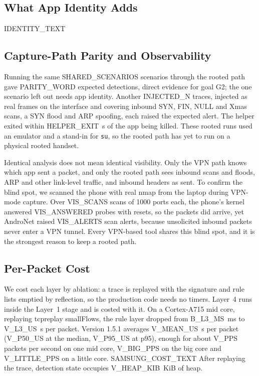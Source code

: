 \documentclass[runningheads]{llncs}
\begin{document}
\subsection{What App Identity Adds}\label{sec:identity}

{{IDENTITY_TEXT}}

\subsection{Capture-Path Parity and Observability}\label{sec:parity}

Running the same {{SHARED_SCENARIOS}} scenarios through the rooted path gave {{PARITY_WORD}} expected detections, direct evidence for goal G2; the one scenario left out needs app identity. Another {{INJECTED_N}} traces, injected as real frames on the interface and covering inbound SYN, FIN, NULL and Xmas scans, a SYN flood and ARP spoofing, each raised the expected alert. The helper exited within {{HELPER_EXIT}}~s of the app being killed. These rooted runs used an emulator and a stand-in for \texttt{su}, so the rooted path has yet to run on a physical rooted handset.

Identical analysis does not mean identical visibility. Only the VPN path knows which app sent a packet, and only the rooted path sees inbound scans and floods, ARP and other link-level traffic, and inbound headers as sent. To confirm the blind spot, we scanned the phone with real nmap from the laptop during VPN-mode capture. Over {{VIS_SCANS}} scans of 1000 ports each, the phone's kernel answered {{VIS_ANSWERED}} probes with resets, so the packets did arrive, yet AndroNet raised {{VIS_ALERTS}} scan alerts, because unsolicited inbound packets never enter a VPN tunnel. Every VPN-based tool shares this blind spot, and it is the strongest reason to keep a rooted path.

\subsection{Per-Packet Cost}\label{sec:cost}

We cost each layer by ablation: a trace is replayed with the signature and rule lists emptied by reflection, so the production code needs no timers. Layer~4 runs inside the Layer~1 stage and is costed with it. On a Cortex-A715 mid core, replaying tcpreplay smallFlows, the rule layer dropped from {{B_L3_MS}}~ms to {{V_L3_US}}~\textmu s per packet. Version 1.5.1 averages {{V_MEAN_US}}~\textmu s per packet ({{V_P50_US}} at the median, {{V_P95_US}} at p95), enough for about {{V_PPS}} packets per second on one mid core, {{V_BIG_PPS}} on the big core and {{V_LITTLE_PPS}} on a little core. {{SAMSUNG_COST_TEXT}} After replaying the trace, detection state occupies {{V_HEAP_KIB}}~KiB of heap.
\end{document}
